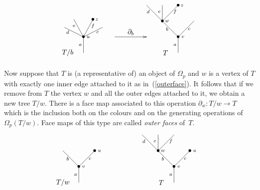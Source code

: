 \documentclass[a4paper]{amsart}
\theoremstyle{plain}
\theoremstyle{definition}
\theoremstyle{remark}
\newcommand{\rpd}{\Omega_p}
\newcommand{\To}{\longrightarrow}
\numberwithin{equation}{section}
\numberwithin{figure}{section}
\begin{document}
\begin{equation}
    \xy<0.08cm,0cm>:
    (-12,-4)*=0{}="t1";
    (-6,1)*=0{}="t2";
    (6,1)*=0{\bullet}="t3";
    (12,-4)*=0{}="t4";
    (0,-10)*=0{\bullet}="t5";
    (0,-20)*=0{}="t6";
    (40,10)*=0{}="5";
    (50,10)*=0{}="6";
    (60,10)*=0{\bullet}="7";
    (50,0)*=0{\bullet}="8";
    (70,0)*=0{}="9";
    (60,-10)*=0{\bullet}="10";
    (60,-20)*=0{}="11";
    (-10,-7)*{\scriptstyle d};
    (-6,-3)*{\scriptstyle e};
    (6,-3)*{\scriptstyle f};
    (9,-7)*{\scriptstyle c};
    (-2,-15)*{\scriptstyle a};
    (3,-10)*{\scriptstyle u};
    (41,6)*{\scriptstyle d};
    (48,6)*{\scriptstyle e};
    (58,6)*{\scriptstyle f};
    (53,-5)*{\scriptstyle b};
    (67,-5)*{\scriptstyle c};
    (63,-10)*{\scriptstyle v};
    (58,-15)*{\scriptstyle a};
    (53,0)*{\scriptstyle w};
    (30,-7)*{\partial_b};
    (8.5,1)*{\scriptstyle z};
    (62.5,10)*{\scriptstyle z};
    (-10,-20)*=0{T/b};
    (52,-20)*=0{T};
    (-10,-25)*=0{};
    "t1";"t5" **\dir{-};
    "t2";"t5" **\dir{-};
    "t3";"t5" **\dir{-};
    "t4";"t5" **\dir{-};
    "t5";"t6" **\dir{-};
    "5";"8" **\dir{-};
    "6";"8" **\dir{-};
    "7";"8" **\dir{-};
    "8";"10" **\dir{-};
    "9";"10" **\dir{-};
    "10";"11" **\dir{-};
    {\ar(20, -10)*{};(40,-10)*{}};
    \endxy
    \label{innerface}
\end{equation}


Now suppose that $T$ is (a representative of) an object of $\rpd$ and $w$ is a vertex of $T$ with exactly one inner edge
attached to it as in~(\ref{outerface}). It follows that if we remove from $T$ the vertex $w$ and all the outer edges
attached to it, we obtain a new tree $T/w$. There is a face map associated to this operation $\partial_w:T/w\To T$ which is
the inclusion both on the colours and on the generating operations of $\Omega_p(T/w)$. Face maps of this type are called \emph{outer faces} of~$T$.

\begin{equation}
    \xy<0.08cm,0cm>:
    (-10,0)*=0{}="1";
    (10,0)*=0{\bullet}="2";
    (0,-10)*=0{\bullet}="3";
    (0,-20)*=0{}="4";
    (40,10)*=0{}="5";
    (50,10)*=0{}="6";
    (60,10)*=0{}="7";
    (50,0)*=0{\bullet}="8";
    (70,0)*=0{\bullet}="9";
    (60,-10)*=0{\bullet}="10";
    (60,-20)*=0{}="11";
    (13,0)*{\scriptstyle u};
    (-7,-5)*{\scriptstyle b};
    (7,-5)*{\scriptstyle c};
    (3,-10)*{\scriptstyle v};
    (-2,-15)*{\scriptstyle a};
    (41,6)*{\scriptstyle d};
    (48,6)*{\scriptstyle e};
    (58,6)*{\scriptstyle f};
    (53,-5)*{\scriptstyle b};
    (67,-5)*{\scriptstyle c};
    (63,-10)*{\scriptstyle v};
    (58,-15)*{\scriptstyle a};
    (73,0)*{\scriptstyle u};
    (53,0)*{\scriptstyle w};
    (-10,-20)*=0{T/w};
    (-10,-25)*=0{};
    (52,-20)*=0{T};
    "1";"3" **\dir{-};
    "2";"3" **\dir{-};
    "3";"4" **\dir{-};
    "5";"8" **\dir{-};
    "6";"8" **\dir{-};
    "7";"8" **\dir{-};
    "8";"10" **\dir{-};
    "9";"10" **\dir{-};
    "10";"11" **\dir{-};
    \endxy
    \label{outerface}
\end{equation}
\end{document}
